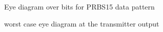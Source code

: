 \begin{figure}[ht]
  \centering
  \caption{Eye diagram over \unit[10000]{bits} for PRBS15 data pattern}
  \label{fig:eye_prbs15}
\end{figure}

\begin{figure}[ht]
  \centering
  \caption{worst case eye diagram at the transmitter output}
  \label{fig:wc_eye}
\end{figure}

